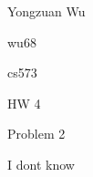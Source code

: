 \documentclass[a4paper,12pt]{article}
\begin{document}
Yongzuan Wu

wu68

cs573

HW 4

Problem 2

I dont know
\end{document}

